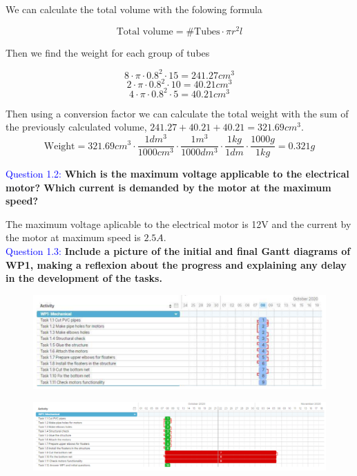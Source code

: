 \documentclass[12pt, a4papre]{article}
\begin{document}
	We can calculate the total volume with the folowing formula
	
	\[
		\text{Total volume} = \text{\#Tubes}\cdot\pi r^2 l
	\]
	
	Then we find the weight for each group of tubes
	
	\[
		8\cdot \pi \cdot0.8^2\cdot 15 = 241.27 cm^3
	\]
	\[
		2\cdot \pi \cdot0.8^2\cdot 10 = 40.21 cm^3
	\]
	\[
		4\cdot \pi \cdot0.8^2\cdot 5 = 40.21 cm^3
	\]
	
	Then using a conversion factor we can calculate the total weight with the sum of the previously calculated volume, $241.27 + 40.21 + 40.21 = 321.69 cm^3$.
	\[
		\text{Weight} = 321.69cm^3\cdot \frac{1dm^3}{1000cm^3}\cdot \frac{1m^3}{1000dm^3}\cdot \frac{1kg}{1dm}\cdot \frac{1000g}{1kg} = 0.321 g
	\]
	
	\textcolor{blue}{Question 1.2:} \textbf{Which is the maximum voltage applicable to the electrical motor? Which current is demanded by the motor at the maximum speed?}
	
	The maximum voltage aplicable to the electrical motor is 12V and the current by the motor at maximum speed is $2.5A$.\\
	\newpage
	\textcolor{blue}{Question 1.3:} \textbf{Include a picture of the initial and final Gantt diagrams of WP1, making a reflexion about the progress and explaining any delay in the development of the tasks.}
	
	\begin{figure}[H]
		\begin{center}
		\includegraphics[width=135mm]{WP1_ini}
		\end{center}
	\end{figure}
	\begin{figure}[H]
		\begin{center}
		\includegraphics[width=135mm]{WP1_fin}
		\end{center}
	\end{figure}
	
\end{document}
